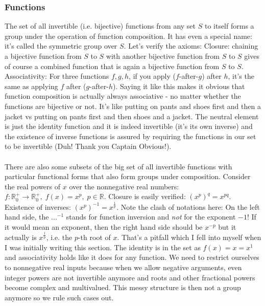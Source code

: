 

\subsubsection{Functions}
The set of all invertible (i.e. bijective) functions from any set $S$ to itself forms a group under the operation of function composition. It has even a special name: it's called the symmetric group over $S$. Let's verify the axioms: Closure: chaining a bijective function from $S$ to $S$ with another bijective function from $S$ to $S$ gives of course a combined function that is again a bijective function from $S$ to $S$. Associativity: For three functions $f,g,h$, if you apply ($f$-after-$g$) after $h$, it's the same as applying $f$ after ($g$-after-$h$). Saying it like this makes it obvious that function composition is actually always associative - no matter whether the functions are bijective or not. It's like putting on pants and shoes first and then a jacket vs putting on pants first and then shoes and a jacket. The neutral element is just the identity function and it is indeed invertible (it's its own inverse) and the existence of inverse functions is assured by requiring the functions in our set to be invertible (Duh! Thank you Captain Obvious!).

\paragraph{} There are also some subsets of the big set of all invertible functions with particular functional forms that also form groups under composition. Consider the real powers of $x$ over the nonnegative real numbers: $f: \mathbb{R}^+_0 \rightarrow \mathbb{R}^+_0, \; f(x) = x^p, \; p \in \mathbb{R}$. Closure is easily verified: $(x^p)^q = x^{p q}$. Existence of inverses: $(x^p)^{-1} = x^{\frac{1}{p}}$. Note the clash of notations here: On the left hand side, the $...^{-1}$ stands for function inversion and \emph{not} for the exponent $-1$! If it would mean an exponent, then the right hand side should be $x^{-p}$ but it actually is $x^{\frac{1}{p}}$, i.e. the $p$-th root of $x$. That's a pitfall which I fell into myself when I was initially writing this section. The identity is in the set as $f(x) = x = x^1$ and associativity holds like it does for any function. We need to restrict ourselves to nonnegative real inputs because when we allow negative arguments, even integer powers are not invertible anymore and roots and other fractional powers become complex and multivalued. This messy structure is then not a group anymore so we rule such cases out.

